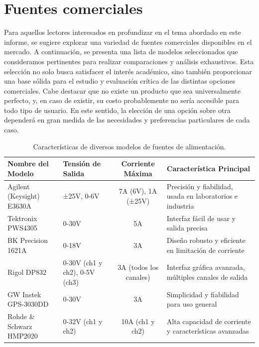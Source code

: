 \section{Fuentes comerciales}\par 
Para aquellos lectores interesados en profundizar en el tema abordado en este informe, se sugiere explorar una variedad de fuentes comerciales disponibles en el mercado. A continuación, se presenta una lista de modelos seleccionados que consideramos pertinentes para realizar comparaciones y análisis exhaustivos. Esta selección no solo busca satisfacer el interés académico, sino también proporcionar una base sólida para el estudio y evaluación crítica de las distintas opciones comerciales. Cabe destacar que no existe un producto que sea universalmente perfecto, y, en caso de existir, su costo probablemente no sería accesible para todo tipo de usuario. En este sentido, la elección de una opción sobre otra dependerá en gran medida de las necesidades y preferencias particulares de cada caso. \par 
\begin{table}[h!]
    \centering
    \caption{Características de diversos modelos de fuentes de alimentación.}
    \label{tab:fuentes_alimentacion}
    \begin{tabular}{|p{3cm}|p{3cm}|c|p{5cm}|}
        \hline
        \textbf{Nombre del Modelo} & \textbf{Tensión de Salida} & \textbf{Corriente Máxima} & \textbf{Característica Principal} \\ \hline \hline
        Agilent (Keysight) E3630A & ±25V, 0-6V & 7A (6V), 1A (±25V) & Precisión y fiabilidad, usada en laboratorios e industria \\ \hline
        Tektronix PWS4305 & 0-30V & 5A & Interfaz fácil de usar y salida precisa \\ \hline
        BK Precision 1621A & 0-18V & 3A & Diseño robusto y eficiente en limitación de corriente \\ \hline
        Rigol DP832 & 0-30V (ch1 y ch2), 0-5V (ch3) & 3A (todos los canales) & Interfaz gráfica avanzada, múltiples canales de salida \\ \hline
        GW Instek GPS-3030DD & 0-30V & 3A & Simplicidad y fiabilidad para uso general \\ \hline
        Rohde \& Schwarz HMP2020 & 0-32V (ch1 y ch2) & 10A (ch1 y ch2) & Alta capacidad de corriente y características avanzadas \\ \hline
    \end{tabular}
\end{table}




